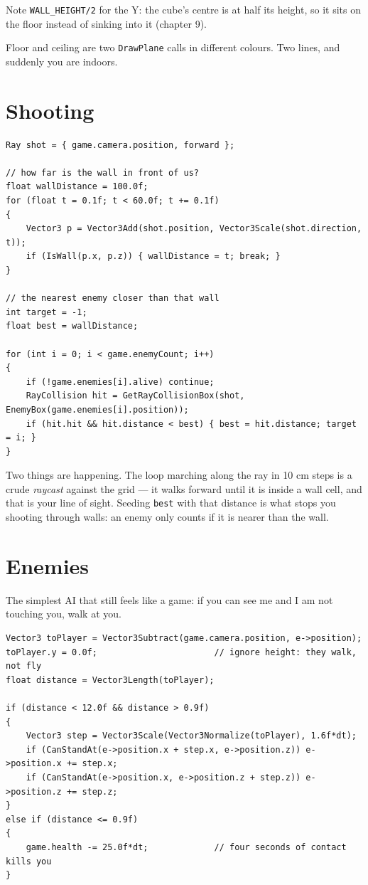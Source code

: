 Note \lstinline|WALL_HEIGHT/2| for the Y: the cube's centre is at half its
height, so it sits on the floor instead of sinking into it (chapter 9).

Floor and ceiling are two \lstinline|DrawPlane| calls in different colours. Two
lines, and suddenly you are indoors.

\section{Shooting}

\begin{lstlisting}
Ray shot = { game.camera.position, forward };

// how far is the wall in front of us?
float wallDistance = 100.0f;
for (float t = 0.1f; t < 60.0f; t += 0.1f)
{
    Vector3 p = Vector3Add(shot.position, Vector3Scale(shot.direction, t));
    if (IsWall(p.x, p.z)) { wallDistance = t; break; }
}

// the nearest enemy closer than that wall
int target = -1;
float best = wallDistance;

for (int i = 0; i < game.enemyCount; i++)
{
    if (!game.enemies[i].alive) continue;
    RayCollision hit = GetRayCollisionBox(shot, EnemyBox(game.enemies[i].position));
    if (hit.hit && hit.distance < best) { best = hit.distance; target = i; }
}
\end{lstlisting}

Two things are happening. The loop marching along the ray in 10 cm steps is a
crude \emph{raycast} against the grid --- it walks forward until it is inside a
wall cell, and that is your line of sight. Seeding \lstinline|best| with that
distance is what stops you shooting through walls: an enemy only counts if it is
nearer than the wall.


\section{Enemies}

The simplest AI that still feels like a game: if you can see me and I am not
touching you, walk at you.

\begin{lstlisting}
Vector3 toPlayer = Vector3Subtract(game.camera.position, e->position);
toPlayer.y = 0.0f;                       // ignore height: they walk, not fly
float distance = Vector3Length(toPlayer);

if (distance < 12.0f && distance > 0.9f)
{
    Vector3 step = Vector3Scale(Vector3Normalize(toPlayer), 1.6f*dt);
    if (CanStandAt(e->position.x + step.x, e->position.z)) e->position.x += step.x;
    if (CanStandAt(e->position.x, e->position.z + step.z)) e->position.z += step.z;
}
else if (distance <= 0.9f)
{
    game.health -= 25.0f*dt;             // four seconds of contact kills you
}
\end{lstlisting}


